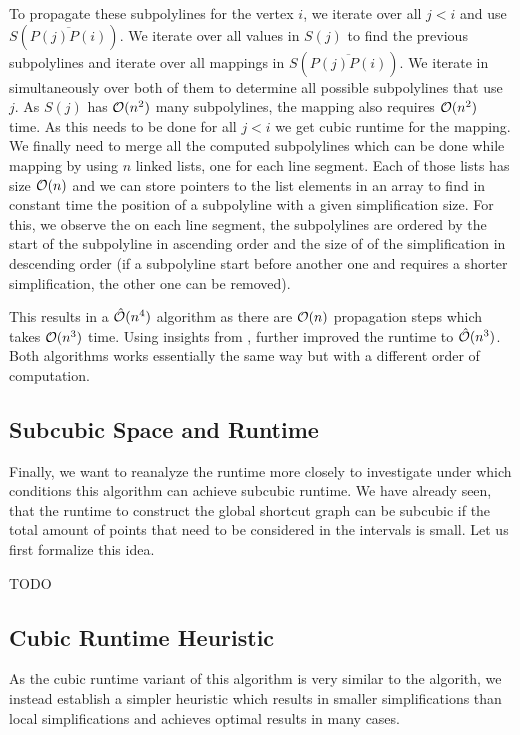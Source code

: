 To propagate these subpolylines for the vertex \(i\), we iterate over all \(j < i\) and use \(S(\overline{P(j)P(i)})\). We iterate over all values in \(S(j)\) to find the previous subpolylines and iterate over all mappings in \(S(\overline{P(j)P(i)})\). We iterate in simultaneously over both of them to determine all possible subpolylines that use \(j\). As \(S(j)\) has \(\mathcal{O}(n^2)\) many subpolylines, the mapping also requires \(\mathcal{O}(n^2)\) time. As this needs to be done for all \(j < i\) we get cubic runtime for the mapping. We finally need to merge all the computed subpolylines which can be done while mapping by using \(n\) linked lists, one for each line segment. Each of those lists has size \(\mathcal{O}(n)\) and we can store pointers to the list elements in an array to find in constant time the position of a subpolyline with a given simplification size. For this, we observe the on each line segment, the subpolylines are ordered by the start of the subpolyline in ascending order and the size of of the simplification in descending order (if a subpolyline start before another one and requires a shorter simplification, the other one can be removed).

This results in a \(\hat{\mathcal{O}}(n^4)\) algorithm as there are \(\mathcal{O}(n)\) propagation steps which takes \(\mathcal{O}(n^3)\) time. Using insights from \citeauthor{polyline_simplification_has_cubic_complexity_bringmannetal}, \citeauthor{global_curve_simplification} further improved the runtime to \(\hat{\mathcal{O}}(n^3)\). Both algorithms works essentially the same way but with a different order of computation.

\subsection{Subcubic Space and Runtime}
Finally, we want to reanalyze the runtime more closely to investigate under which conditions this algorithm can achieve subcubic runtime. We have already seen, that the runtime to construct the global shortcut graph can be subcubic if the total amount of points that need to be considered in the intervals is small. Let us first formalize this idea.

TODO

\subsection{Cubic Runtime Heuristic}
As the cubic runtime variant of this algorithm is very similar to the \citeauthor{polyline_simplification_has_cubic_complexity_bringmannetal} algorith, we instead establish a simpler heuristic which results in smaller simplifications than local simplifications and achieves optimal results in many cases.


